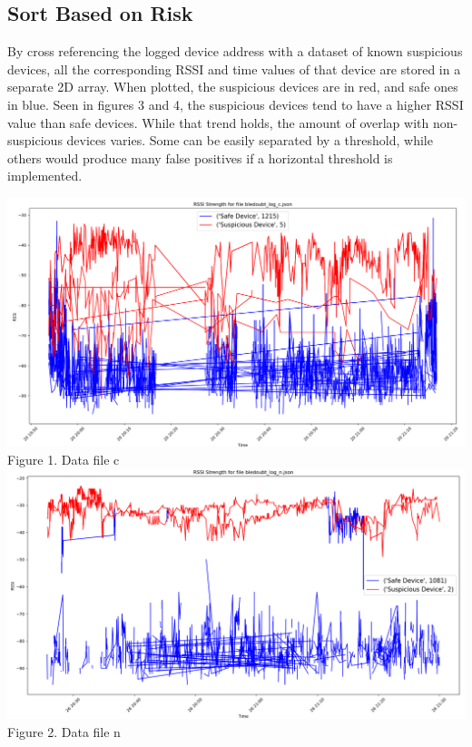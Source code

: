 \documentclass{article}
\begin{document}
\begin{multicols}{2}
\subsection{Sort Based on Risk}
By cross referencing the logged device address with a dataset of known suspicious devices, all the corresponding RSSI and time values of that device are stored in a separate 2D array. When plotted, the suspicious devices are in red, and safe ones in blue. Seen in figures 3 and 4, the suspicious devices tend to have a higher RSSI value than safe devices. While that trend holds, the amount of overlap with non-suspicious devices varies. Some can be easily separated by a threshold, while others would produce many false positives if a horizontal threshold is implemented.
\begin{center}
\includegraphics[width=1\linewidth]{Final-output-C.png}
Figure 1. Data file c
\includegraphics[width=1\linewidth]{Final-output-N.png}
Figure 2. Data file n
\end{center}
\end{multicols}
\end{document}
